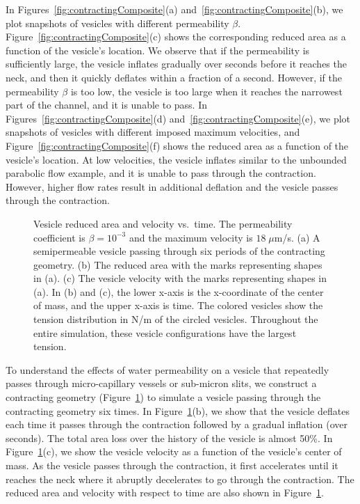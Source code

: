 \documentclass[prb,preprint,showpacs,preprintnumbers,amsmath,amssymb,longbibliography]{revtex4-1}
\newif\ifTikz
\begin{document}
In Figures~\ref{fig:contractingComposite}(a)
and~\ref{fig:contractingComposite}(b), we plot snapshots of vesicles
with different permeability $\beta$.
Figure~\ref{fig:contractingComposite}(c) shows the corresponding reduced
area as a function of the vesicle's location. We observe that if the
permeability is sufficiently large, the vesicle inflates gradually over
seconds before it reaches the neck, and then it quickly deflates within
a fraction of a second. However, if the permeability $\beta$ is too
low, the vesicle is too large when it reaches the narrowest part of the
channel, and it is unable to pass. In
Figures~\ref{fig:contractingComposite}(d)
and~\ref{fig:contractingComposite}(e), we plot snapshots of vesicles
with different imposed maximum velocities, and
Figure~\ref{fig:contractingComposite}(f) shows the reduced area as a
function of the vesicle's location. At low velocities, the vesicle
inflates similar to the unbounded parabolic flow example, and it is
unable to pass through the contraction. However, higher flow rates
result in additional deflation and the vesicle passes through the
contraction.

\begin{figure}[hbp]
  \centering
  
  \caption{\label{fig:contractingComposite2} Vesicle reduced area and
  velocity vs.~time. The permeability coefficient is $\beta = 10^{-3}$
  and the maximum velocity is $18\;\mu$m/s. (a) A semipermeable vesicle
  passing through six periods of the contracting geometry. (b) The
  reduced area with the marks representing shapes in (a). (c) The
  vesicle velocity with the marks representing shapes in (a). In (b) and
  (c), the lower x-axis is the x-coordinate of the center of mass, and
  the upper x-axis is time. The colored vesicles show the tension
  distribution in N/m of the circled vesicles. Throughout the entire
  simulation, these vesicle configurations have the largest tension.}
\end{figure}
To understand the effects of water permeability on a vesicle that
repeatedly passes through micro-capillary vessels or sub-micron slits,
we construct a contracting geometry
(Figure~\ref{fig:contractingComposite2}) to simulate a vesicle passing
through the contracting geometry six times.  In
Figure~\ref{fig:contractingComposite2}(b), we show that the vesicle
deflates each time it passes through the contraction followed by a
gradual inflation (over seconds). The total area loss over the history
of the vesicle is almost 50\%. In
Figure~\ref{fig:contractingComposite2}(c), we show the vesicle velocity
as a function of the vesicle's center of mass. As the vesicle passes
through the contraction, it first accelerates until it reaches the neck
where it abruptly decelerates to go through the contraction. The reduced
area and velocity with respect to time are also shown in
Figure~\ref{fig:contractingComposite2}.
\end{document}
